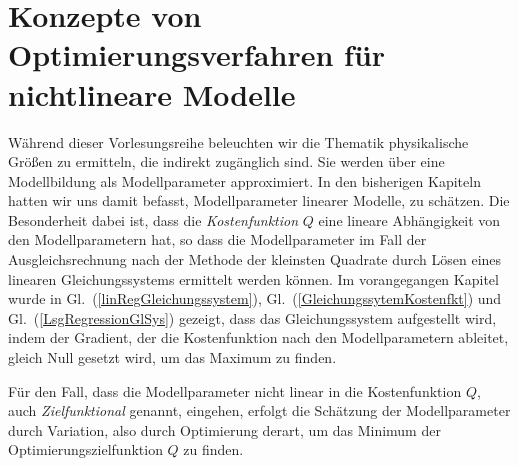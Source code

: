 
\section{Konzepte von Optimierungsverfahren für nichtlineare Modelle}
Während dieser Vorlesungsreihe beleuchten wir die Thematik physikalische Größen zu ermitteln, die
indirekt zugänglich sind. Sie werden über eine Modellbildung als Modellparameter approximiert.
In den bisherigen Kapiteln hatten wir uns damit befasst, Modellparameter linearer Modelle, zu schätzen.
Die Besonderheit dabei ist, dass die \textsl{Kostenfunktion} $Q$ eine lineare Abhängigkeit von den
Modellparametern hat, so dass die Modellparameter
im Fall der Ausgleichsrechnung nach der Methode der kleinsten Quadrate durch Lösen eines 
linearen Gleichungssystems ermittelt werden können.
Im vorangegangen Kapitel wurde in Gl.~(\ref{linRegGleichungssystem}), Gl.~(\ref{GleichungssytemKostenfkt})
 und Gl.~(\ref{LsgRegressionGlSys}) gezeigt, dass das Gleichungssystem
aufgestellt wird, indem der Gradient, der die Kostenfunktion nach den Modellparametern ableitet, gleich Null
gesetzt wird, um das Maximum zu finden.

Für den Fall, dass die Modellparameter nicht linear in die Kostenfunktion $Q$,
auch \textsl{Zielfunktional} genannt, eingehen,
erfolgt die Schätzung der Modellparameter durch Variation, also durch Optimierung derart, um
das Minimum der Optimierungszielfunktion $Q$ zu finden.

